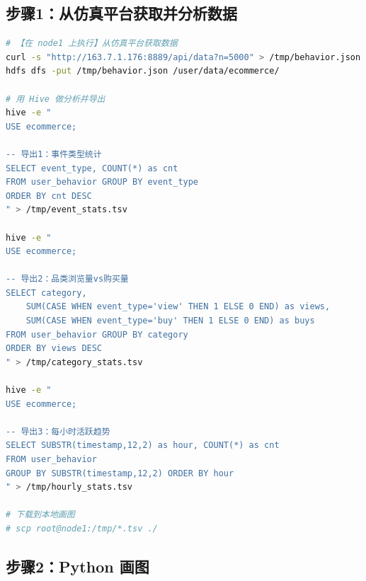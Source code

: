 \documentclass[12pt,a4paper]{article}
\begin{document}
\subsection{步骤1：从仿真平台获取并分析数据}

\begin{lstlisting}[language=bash]
# 【在 node1 上执行】从仿真平台获取数据
curl -s "http://163.7.1.176:8889/api/data?n=5000" > /tmp/behavior.json
hdfs dfs -put /tmp/behavior.json /user/data/ecommerce/

# 用 Hive 做分析并导出
hive -e "
USE ecommerce;

-- 导出1：事件类型统计
SELECT event_type, COUNT(*) as cnt
FROM user_behavior GROUP BY event_type
ORDER BY cnt DESC
" > /tmp/event_stats.tsv

hive -e "
USE ecommerce;

-- 导出2：品类浏览量vs购买量
SELECT category,
    SUM(CASE WHEN event_type='view' THEN 1 ELSE 0 END) as views,
    SUM(CASE WHEN event_type='buy' THEN 1 ELSE 0 END) as buys
FROM user_behavior GROUP BY category
ORDER BY views DESC
" > /tmp/category_stats.tsv

hive -e "
USE ecommerce;

-- 导出3：每小时活跃趋势
SELECT SUBSTR(timestamp,12,2) as hour, COUNT(*) as cnt
FROM user_behavior
GROUP BY SUBSTR(timestamp,12,2) ORDER BY hour
" > /tmp/hourly_stats.tsv

# 下载到本地画图
# scp root@node1:/tmp/*.tsv ./
\end{lstlisting}

\subsection{步骤2：Python 画图}
\end{document}
